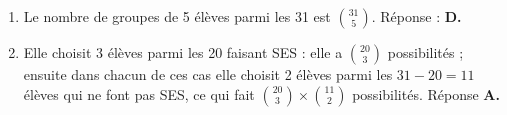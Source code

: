 \begin{enumerate}
$\displaystyle\int_0^2 g'(x)\:\text{d}x = \left[x^2 \ln \left(x^2 + 4\right)\right]_0^2 = 2^2\ln \left(2^2 + 2 \right) = 4\ln 4 + 4)  = 4\ln 8$ ou $4\ln 2^3 = 3 \times 4 \ln 2 = 12\ln 2 \approx 8,31$ soit 8,3 au dixième près. Réponse \textbf{B.}
	\smallskip
	
\item %
	

Le nombre de groupes de 5 élèves parmi les 31 est $\displaystyle\binom{31}{5}$. Réponse : \textbf{D.}
	\item %
	
%	
	
Elle choisit 3 élèves parmi les 20 faisant SES : elle a $\displaystyle\binom{20}{3}$ possibilités ; ensuite dans chacun de ces cas elle choisit 2 élèves parmi les $31 - 20 = 11$ élèves qui ne font pas SES, ce qui fait $\displaystyle\binom{20}{3} \times \binom{11}{2}$ possibilités. Réponse \textbf{A.}
\end{enumerate}

\bigskip


